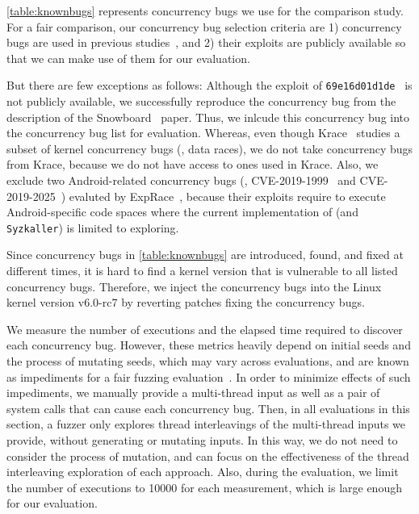 


%
\autoref{table:knownbugs} represents concurrency bugs we use for the
comparison study.
%
For a fair comparison, our concurrency bug selection criteria are 1)
concurrency bugs are used in previous studies~\cite{exprace, razzer,
  snowboard, moonshine, fuze}, and 2) their exploits are publicly
available so that we can make use of them for our evaluation.

But there are few exceptions as follows: Although the exploit of
\texttt{69e16d01d1de}~\cite{snowboardbug} is not publicly available,
we successfully reproduce the concurrency bug from the description of
the Snowboard~\cite{snowboard} paper. Thus, we inlcude this
concurrency bug into the concurrency bug list for evaluation.
%
Whereas, even though Krace~\cite{krace} studies a subset of kernel
concurrency bugs (\ie, data races), we do not take concurrency bugs
from Krace, because we do not have access to ones used in Krace.
%
Also, we exclude two Android-related concurrency bugs (\ie,
CVE-2019-1999~\cite{cve20191999} and CVE-2019-2025~\cite{cve20192025})
evaluted by ExpRace~\cite{exprace}, because their exploits require to
execute Android-specific code spaces where the current implementation
of \sys (and \texttt{Syzkaller}) is limited to exploring.



%
Since concurrency bugs in \autoref{table:knownbugs} are introduced,
found, and fixed at different times, it is hard to find a kernel
version that is vulnerable to all listed concurrency bugs.
%
Therefore, we inject the concurrency bugs into the Linux kernel
version v6.0-rc7 by reverting patches fixing the concurrency bugs.



%
We measure the number of executions and the elapsed time required to
discover each concurrency bug.
%
However, these metrics heavily depend on initial seeds and the process
of mutating seeds, which may vary across evaluations, and are known as
impediments for a fair fuzzing evaluation~\cite{fuzzingeval}.
%
In order to minimize effects of such impediments, we manually provide
a multi-thread input as well as a pair of system calls that can cause
each concurrency bug.
%
Then, in all evaluations in this section, a fuzzer only explores
thread interleavings of the multi-thread inputs we provide, without
generating or mutating inputs.
%
In this way, we do not need to consider the process of mutation, and
can focus on the effectiveness of the thread interleaving exploration
of each approach.
%
Also, during the evaluation, we limit the number of executions to
10000 for each measurement, which is large enough for our evaluation.
%





